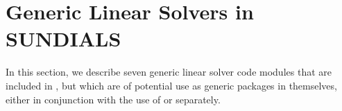\chapter{Generic Linear Solvers in SUNDIALS}\label{s:gen_linsolv}
In this section, we describe seven generic linear solver code modules that 
are included in {\ida}, but which are of potential use as generic packages in
themselves, either in conjunction with the use of {\ida} or separately.


